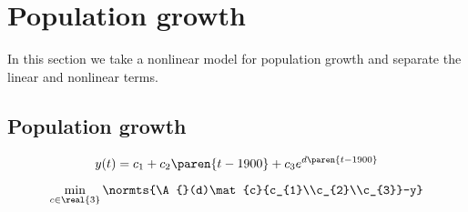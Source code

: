 \break
\clearpage
\section{\label{sec:population}Population growth}

In this section we take a nonlinear model for population growth and separate the linear and nonlinear terms.

\subsection{Population growth}

  \begin{equation}
      y(t) = c_{1} + c_{2} \paren{t-1900} + c_{3} e^{d\paren{t-1900}}
  \end{equation}

  \begin{equation}
      \min_{c\in\real{3}} \normts{\A{}(d)\mat{c}{c_{1}\\c_{2}\\c_{3}}-y}
  \end{equation}

\endinput  %